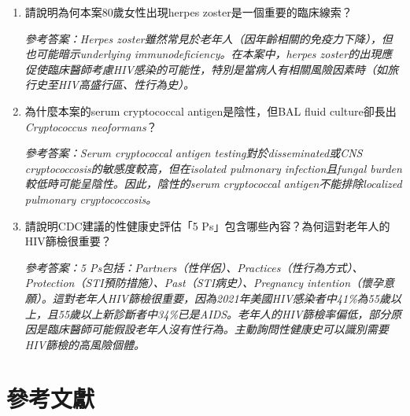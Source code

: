 \documentclass[12pt,a4paper]{article}
\begin{document}
\begin{enumerate}
    \item 請說明為何本案80歲女性出現herpes zoster是一個重要的臨床線索？

    \textit{參考答案：Herpes zoster雖然常見於老年人（因年齡相關的免疫力下降），但也可能暗示underlying immunodeficiency。在本案中，herpes zoster的出現應促使臨床醫師考慮HIV感染的可能性，特別是當病人有相關風險因素時（如旅行史至HIV高盛行區、性行為史）。}

    \vspace{0.3cm}

    \item 為什麼本案的serum cryptococcal antigen是陰性，但BAL fluid culture卻長出\textit{Cryptococcus neoformans}？

    \textit{參考答案：Serum cryptococcal antigen testing對於disseminated或CNS cryptococcosis的敏感度較高，但在isolated pulmonary infection且fungal burden較低時可能呈陰性。因此，陰性的serum cryptococcal antigen不能排除localized pulmonary cryptococcosis。}

    \vspace{0.3cm}

    \item 請說明CDC建議的性健康史評估「5 Ps」包含哪些內容？為何這對老年人的HIV篩檢很重要？

    \textit{參考答案：5 Ps包括：Partners（性伴侶）、Practices（性行為方式）、Protection（STI預防措施）、Past（STI病史）、Pregnancy intention（懷孕意願）。這對老年人HIV篩檢很重要，因為2021年美國HIV感染者中41\%為55歲以上，且55歲以上新診斷者中34\%已是AIDS。老年人的HIV篩檢率偏低，部分原因是臨床醫師可能假設老年人沒有性行為。主動詢問性健康史可以識別需要HIV篩檢的高風險個體。}
\end{enumerate}

\section{參考文獻}
\end{document}
